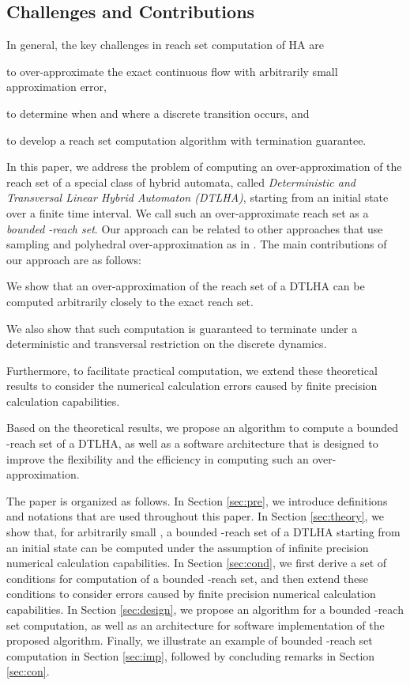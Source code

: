 \subsection{Challenges and Contributions}
In general, the key challenges in reach set computation of HA are 
\begin{inparaenum}[(i)] 
	\item to over-approximate the exact continuous flow with arbitrarily small approximation error,
	\item to determine when and where a discrete transition occurs, and
	\item to develop a reach set computation algorithm with termination guarantee. 
\end{inparaenum}
In this paper, we address the problem of computing an over-approximation of the reach set of a special class of hybrid automata, called {\em Deterministic and Transversal Linear Hybrid Automaton (DTLHA)}, starting from an initial state over a finite time interval.
We call such an over-approximate reach set as a {\em bounded -reach set}.
Our approach can be related to other approaches that use sampling and polyhedral over-approximation as in \cite{chutinan:03, asarin:00}.
The main contributions of our approach are as follows: 
\begin{inparaenum}[(i)]
	\item We show that an over-approximation of the reach set of a DTLHA can be computed arbitrarily closely to the exact reach set.
	\item We also show that such computation is guaranteed to terminate under a deterministic and transversal restriction on the discrete dynamics. 
	\item Furthermore, to facilitate practical computation, we extend these theoretical results to consider the numerical calculation errors caused by finite precision calculation capabilities. 
\end{inparaenum}
Based on the theoretical results, we propose an algorithm to compute a bounded -reach set of a DTLHA, as well as a software architecture that is designed to improve the flexibility and the efficiency in computing such an over-approximation.

The paper is organized as follows.
In Section \ref{sec:pre}, we introduce definitions and notations that are used throughout this paper.
In Section \ref{sec:theory}, we show that, for arbitrarily small , a bounded -reach set of a DTLHA starting from an initial state can be computed under the assumption of infinite precision numerical calculation capabilities. 
In Section \ref{sec:cond}, we first derive a set of conditions for computation of a bounded -reach set, and then extend these conditions to consider errors caused by finite precision numerical calculation capabilities.
In Section \ref{sec:design}, we propose an algorithm for a bounded -reach set computation, as well as an architecture for software implementation of the proposed algorithm.
Finally, we illustrate an example of bounded -reach set computation in Section \ref{sec:imp}, followed by concluding remarks in Section \ref{sec:con}.





